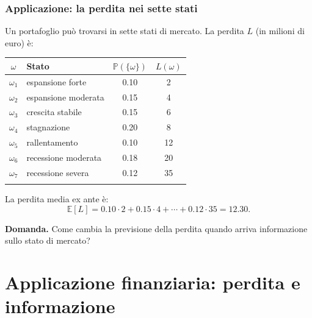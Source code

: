 \documentclass[handout]{beamer}%
\providecommand{\E}{\mathbb{E}}
\providecommand{\Prob}{\mathbb{P}}
\providecommand{\1}{\mathbf{1}}
\providecommand{\QTR}[2]{\csname #1\endcsname{#2}}
\begin{document}
\begin{frame}%
%

\frametitle{Applicazione: la perdita nei sette stati}%
%

%


Un portafoglio pu\`{o} trovarsi in sette stati di mercato. La perdita $L$ (in
milioni di euro) \`{e}:

\medskip

\begin{center}%
\begin{tabular}
[c]{c|l|c|c}%
$\omega$ & Stato & $\Prob(\{\omega\})$ & $L(\omega)$\\\hline
$\omega_{1}$ & espansione forte & 0.10 & 2\\
$\omega_{2}$ & espansione moderata & 0.15 & 4\\
$\omega_{3}$ & crescita stabile & 0.15 & 6\\
$\omega_{4}$ & stagnazione & 0.20 & 8\\
$\omega_{5}$ & rallentamento & 0.10 & 12\\
$\omega_{6}$ & recessione moderata & 0.18 & 20\\
$\omega_{7}$ & recessione severa & 0.12 & 35\\
&  &  &
\end{tabular}

\end{center}

\medskip

La perdita media ex ante \`{e}:
\[
\E[L] = 0.10\cdot2 + 0.15\cdot4 + \cdots+ 0.12\cdot35 = 12.30.
\]


\medskip

\textbf{Domanda.} Come cambia la previsione della perdita quando arriva
informazione sullo stato di mercato?%

\transboxout
\end{frame}%


\section{Applicazione finanziaria: perdita e informazione}
\end{document}
